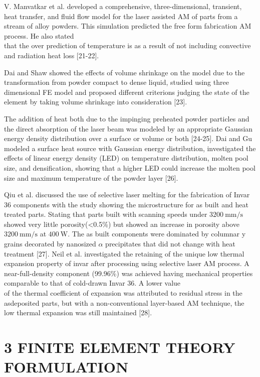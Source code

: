 \documentclass[10pt]{article}
\begin{document}
V. Manvatkar et al. developed a comprehensive, three-dimensional, transient, heat transfer, and fluid flow model for the laser assisted AM of parts from a stream of alloy powders. This simulation predicted the free form fabrication AM process. He also stated\\
that the over prediction of temperature is as a result of not including convective and radiation heat loss [21-22].

Dai and Shaw showed the effects of volume shrinkage on the model due to the transformation from powder compact to dense liquid, studied using three dimensional FE model and proposed different criterions judging the state of the element by taking volume shrinkage into consideration [23].

The addition of heat both due to the impinging preheated powder particles and the direct absorption of the laser beam was modeled by an appropriate Gaussian energy density distribution over a surface or volume or both [24-25]. Dai and Gu modeled a surface heat source with Gaussian energy distribution, investigated the effects of linear energy density (LED) on temperature distribution, molten pool size, and densification, showing that a higher LED could increase the molten pool size and maximum temperature of the powder layer [26].

Qiu et al. discussed the use of selective laser melting for the fabrication of Invar 36 components with the study showing the microstructure for as built and heat treated parts. Stating that parts built with scanning speeds under $3200 \mathrm{~mm} / \mathrm{s}$ showed very little porosity(<0.5\%) but showed an increase in porosity above $3200 \mathrm{~mm} / \mathrm{s}$ at $400 \mathrm{~W}$. The as built components were dominated by columnar y grains decorated by nanosized $\alpha$ precipitates that did not change with heat treatment [27]. Neil et al. investigated the retaining of the unique low thermal expansion property of invar after processing using selective laser AM process. A near-full-density component (99.96\%) was achieved having mechanical properties comparable to that of cold-drawn Invar 36. A lower value\\
of the thermal coefficient of expansion was attributed to residual stress in the asdeposited parts, but with a non-conventional layer-based AM technique, the low thermal expansion was still maintained [28].

\section*{3 FINITE ELEMENT THEORY FORMULATION}
\end{document}
